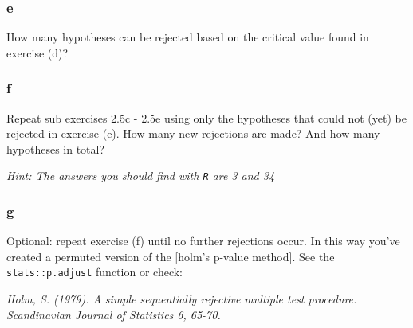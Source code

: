 \documentclass[]{article}
\begin{document}
\hypertarget{e-2}{%
\subsubsection{e}\label{e-2}}

How many hypotheses can be rejected based on the critical value found in
exercise (d)?

\hypertarget{f-1}{%
\subsubsection{f}\label{f-1}}

Repeat sub exercises 2.5c - 2.5e using only the hypotheses that could
not (yet) be rejected in exercise (e). How many new rejections are made?
And how many hypotheses in total?

\emph{Hint: The answers you should find with \texttt{R} are 3 and 34}

\hypertarget{g-1}{%
\subsubsection{g}\label{g-1}}

Optional: repeat exercise (f) until no further rejections occur. In this
way you've created a permuted version of the {[}holm's p-value
method{]}. See the \texttt{stats::p.adjust} function or check:

\emph{Holm, S. (1979). A simple sequentially rejective multiple test
procedure. Scandinavian Journal of Statistics 6, 65-70.}
\end{document}
